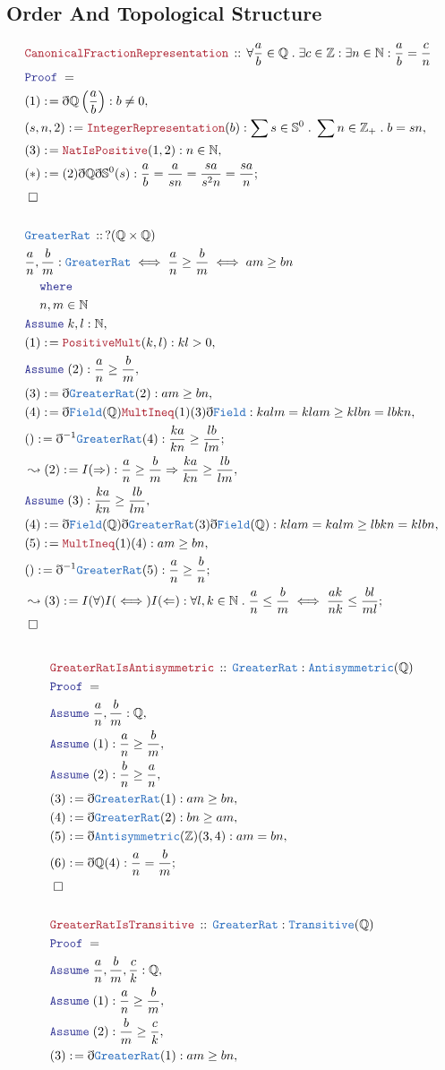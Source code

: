 \documentclass[12pt]{scrartcl}
\newcommand{\TYPE}[1]{\textcolor{NavyBlue}{\mathtt{#1}}}
\newcommand{\LOGIC}[1]{\textcolor{Blue}{\mathtt{#1}}}
\newcommand{\THM}[1]{\textcolor{Maroon}{\mathtt{#1}}}
\renewcommand{\.}{\; . \;}
\newcommand{\de}{: \kern 0.1pc =}
\newcommand{\where}{\LOGIC{where}}
\newcommand{\Theorem}[2]{& \THM{#1} \, :: \, #2 \\ & \Proof = \\ }
\newcommand{\DeclareType}[2]{& \TYPE{#1} \, :: \, #2 \\}
\newcommand{\DefineNamedType}[4]{& #1 : \TYPE{#2} \iff #3 \iff #4 \\}
\newcommand{\NewLine}{\\ & \kern 1pc}
\newcommand{\Page}[1]{ \begin{align*} #1 \end{align*}   }
\newcommand{ \bd }{ \ByDef }
\newcommand{\Int}{\mathbb{Z} }
\newcommand{\Rats}{\mathbb{Q} }
\newcommand{\Nat}{\mathbb{N} }
\newcommand{\Say}[3]{& #1 \de #2 : #3, \\}
\newcommand{\Conclude}[3]{& #1 \de #2 : #3; \\}
\newcommand{\Derive}[3]{& \leadsto #1 \de #2 : #3, \\}
\newcommand{\DeriveConclude}[3]{& \leadsto #1 \de #2 : #3 ; \\}
\newcommand{\Assume}[2]{& \LOGIC{Assume} \; #1 : #2, \\}
\newcommand{\QED}{\; \square}
\newcommand{\EndProof}{& \QED \\}
\newcommand{\ByDef}{\eth}
\newcommand{\Proof}{\LOGIC{Proof} \; }
\begin{document}
\subsection{Order And Topological Structure}
\Page{
	\Theorem{CanonicalFractionRepresentation}{\forall \frac{a}{b} \in \Rats \. \exists c \in \Int : \exists n \in \Nat : \frac{a}{b} = \frac{c}{n}}
	\Say{(1)}{\bd \Rats \left(\frac{a}{b}\right)}{b \neq 0}
	\Say{(s,n,2)}{\THM{IntegerRepresentation}(b)}{\sum s \in \mathbb{S}^0 \. \sum n \in \Int_+ \. b = sn}
	\Say{(3)}{\THM{NatIsPositive}(1,2)}{n \in \Nat}
	\Conclude{(*)}{(2)\bd \Rats \bd \mathbb{S}^0(s)}{ \frac{a}{b} = \frac{a}{sn} = \frac{sa}{s^2 n} = \frac{sa}{n}   }
	\EndProof
	\\
	\DeclareType{GreaterRat}{?(\Rats \times \Rats)}
	\DefineNamedType{\frac{a}{n},\frac{b}{m}}{GreaterRat}{\frac{a}{n} \ge \frac{b}{m}}{am \ge bn \NewLine \where \NewLine n,m \in \Nat}
	\Assume{k,l}{\Nat}
	\Say{(1)}{\THM{PositiveMult}(k,l)}{kl>0}
	\Assume{(2)}{\frac{a}{n} \ge \frac{b}{m}}
	\Say{(3)}{\bd \TYPE{GreaterRat}(2)}{am \ge bn}
	\Say{(4)}{ \bd\TYPE{Field}(\Rats)\THM{MultIneq}(1)(3)\bd \TYPE{Field}}{ kalm = klam \ge klbn = lbkn}
	\Conclude{()}{ \bd^{-1} \TYPE{GreaterRat}(4) }{\frac{ka}{kn} \ge \frac{lb}{lm}}
	\Derive{(2)}{I(\Rightarrow)}{ \frac{a}{n} \ge \frac{b}{m} \Rightarrow \frac{ka}{kn} \ge \frac{lb}{lm}  }
	\Assume{(3)}{ \frac{ka}{kn} \ge \frac{lb}{lm}  }
	\Say{(4)}{\bd \TYPE{Field}(\Rats) \bd \TYPE{GreaterRat}(3) \bd \TYPE{Field}(\Rats)}{ klam = kalm \ge lbkn = klbn  }
	\Say{(5)}{\THM{MultIneq}(1)(4)}{ am \ge bn}
	\Conclude{()}{\bd^{-1}\TYPE{GreaterRat}(5)}{\frac{a}{n} \ge \frac{b}{n}}
	\DeriveConclude{(3)}{ I(\forall)I(\iff)I(\Leftarrow)  }{ \forall l,k \in \Nat \.  \frac{a}{n} \le \frac{b}{m} \iff \frac{ak}{nk} \le \frac{bl}{ml}}            
	\EndProof
	\\
}\Page{
	\Theorem{GreaterRatIsAntisymmetric}{\TYPE{GreaterRat} : \TYPE{Antisymmetric}(\Rats)}
	\Assume{\frac{a}{n},\frac{b}{m}}{\Rats}
	\Assume{(1)}{\frac{a}{n} \ge \frac{b}{m}}
	\Assume{(2)}{\frac{b}{n} \ge \frac{a}{n}}
	\Say{(3)}{\bd \TYPE{GreaterRat}(1)}{am \ge bn}
	\Say{(4)}{\bd \TYPE{GreaterRat}(2)}{bn \ge am}
	\Say{(5)}{\bd \TYPE{Antisymmetric}(\Int)(3,4)}{ am = bn  }
	\Conclude{(6)}{  \bd \Rats(4)   }{\frac{a}{n} = \frac{b}{m}}
	\EndProof
	\\
	\Theorem{GreaterRatIsTransitive}{ \TYPE{GreaterRat} : \TYPE{Transitive}(\Rats)}
	\Assume{\frac{a}{n},\frac{b}{m},\frac{c}{k} }{\Rats}
	\Assume{(1)}{\frac{a}{n} \ge \frac{b}{m}}
	\Assume{(2)}{\frac{b}{m} \ge \frac{c}{k}}
	\Say{(3)}{  \bd \TYPE{GreaterRat}(1)}{ am \ge bn}
}
\end{document}
